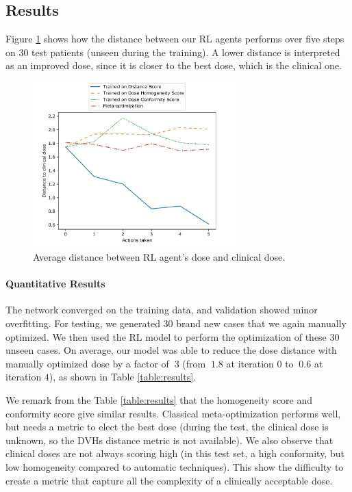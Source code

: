\subsection{Results}
Figure \ref{fig:distance} shows how the distance between our RL agents performs over five steps on 30 test patients (unseen during the training).
A lower distance is interpreted as an improved dose, since it is closer to the best dose, which is the clinical one.
\begin{figure}
	\centering
	\includegraphics[width=0.7\textwidth]{AIME/DistanceToClinicalDose.pdf}
	\caption{Average distance between RL agent's dose and clinical dose.}
	\label{fig:distance}
\end{figure}

\paragraph{Quantitative Results}
The network converged on the training data, and validation showed minor overfitting.
For testing, we generated 30 brand new cases that we again manually optimized.
We then used the RL model to perform the optimization of these 30 unseen cases.
On average, our model was able to reduce the dose distance with manually optimized dose by a factor of $~3$ (from $~1.8$ at iteration $0$ to $~0.6$ at iteration $4$), as shown in Table \ref{table:results}.

We remark from the Table \ref{table:results} that the homogeneity score and conformity score give similar results.
Classical meta-optimization performs well, but needs a metric to elect the best dose (during the test, the clinical dose is unknown, so the DVHs distance metric is not available).
We also observe that clinical doses are not always scoring high (in this test set, a high conformity, but low homogeneity compared to automatic techniques).
This show the difficulty to create a metric that capture all the complexity of a clinically acceptable dose.

